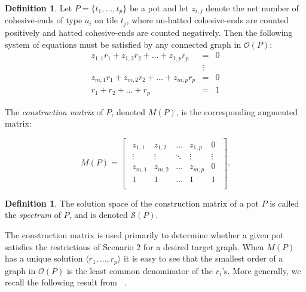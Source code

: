 \documentclass{elsarticle}
\theoremstyle{definition}
\newtheorem{definition}[theorem]{Definition}
\theoremstyle{remark}
\theoremstyle{plain}
\theoremstyle{plain}
\begin{document}
\begin{definition}\label{matrix} Let $P = \{ t_1,...,t_p \}$ be a pot and let $z_{i,j}$ denote the net number of cohesive-ends of type $a_i$ on tile $t_j$, where un-hatted cohesive-ends are counted positively and hatted cohesive-ends are counted negatively. Then the following system of equations must be satisfied by any connected graph in $\mathcal{O}(P)$:
\begin{eqnarray*} z_{1,1}r_1+z_{1,2}r_2+...+z_{1,p}r_p &=& 0 \\
& \vdots & \\
z_{m,1}r_1+z_{m,2}r_2+...+z_{m,p}r_p &=& 0 \\
r_1 + r_2 + ... + r_p &=& 1 \end{eqnarray*}

The \emph{construction matrix} of $P$, denoted $M(P)$, is the corresponding augmented matrix:

\begin{equation}
M(P) = \begin{bmatrix} \begin{array}{*{20}{cccc|c}}
   {{z_{1,1}}} & {{z_{1,2}}} &  \ldots  & {{z_{1,p}}} & 0  \\
    \vdots  &  \vdots  & {\ddots} &  \vdots  & {} \vdots \\
   {{z_{m,1}}} & {{z_{m,2}}} &  \ldots  & {{z_{m,p}}} & 0  \\
1 & 1 &  \ldots  & 1 & 1  \\
 \end{array} \end{bmatrix}. 
\end{equation}
\end{definition}

\begin{definition} The solution space of the construction matrix of a pot $P$ is called the {\it spectrum} of $P$, and is denoted  $\mathcal S(P)$. \end{definition}

The construction matrix is used primarily to determine whether a given pot satisfies the restrictions of Scenario 2 for a desired target graph. When $M(P)$ has a unique solution $\langle r_1,...,r_p \rangle$ it is easy to see that the smallest order of a graph in $\mathcal{O}(P)$ is the least common denominator of the $r_i$'s.  More generally, we recall the following result from ~\cite{ellis2014minimal}.
\end{document}

